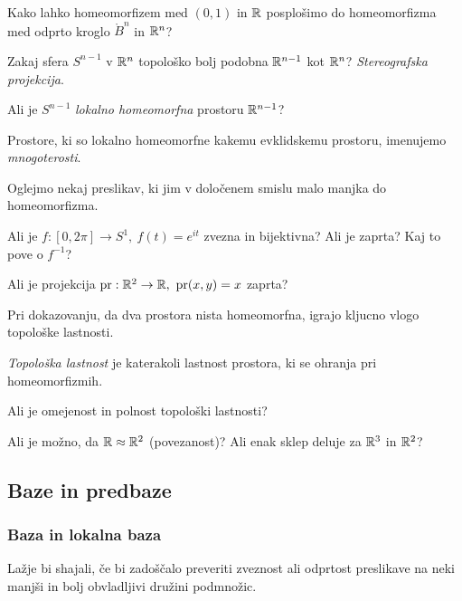 \begin{primer}
    Kako lahko homeomorfizem med $(0, 1)$ in $\mathbb{R}$ posplošimo do homeomorfizma med odprto kroglo $\mathring{B}^n$ in $\mathbb{R}^n$?
\end{primer}

\begin{primer}
    Zakaj sfera $S^{n-1}$ v $\mathbb{R}^n$ topološko bolj podobna $\mathbb{R}^{n-1}$ kot $\mathbb{R}^n$? \emph{Stereografska projekcija}.

    Ali je $S^{n-1}$ \emph{lokalno homeomorfna} prostoru $\mathbb{R}^{n-1}$?
\end{primer}

\begin{definicija}
    Prostore, ki so lokalno homeomorfne kakemu evklidskemu prostoru, imenujemo \emph{mnogoterosti}.
\end{definicija}

Oglejmo nekaj preslikav, ki jim v določenem smislu malo manjka do homeomorfizma.

\begin{primer}
    Ali je $f: [0, 2 \pi] \to S^1, \ f(t) = e^{it}$ zvezna in bijektivna? Ali je zaprta? Kaj to pove o $f^{-1}$?
\end{primer}

\begin{primer}
    Ali je projekcija $\pr: \R^2 \to \R, \ \pr(x,y) = x$ zaprta?
\end{primer}

Pri dokazovanju, da dva prostora nista homeomorfna, igrajo kljucno vlogo topološke lastnosti.

\begin{definicija}
    \emph{Topološka lastnost} je katerakoli lastnost prostora, ki se ohranja pri homeomorfizmih.
\end{definicija}

\begin{primer}
    Ali je omejenost in polnost topološki lastnosti?
\end{primer}

\begin{primer}
    Ali je možno, da $\mathbb{R} \approx \mathbb{R}^2$ (povezanost)? Ali enak sklep deluje za $\mathbb{R}^3$ in $\mathbb{R}^2$?
\end{primer}

\newpage
\subsection{Baze in predbaze}
\subsubsection{Baza in lokalna baza}
Lažje bi shajali, če bi zadoščalo preveriti zveznost ali odprtost preslikave na neki manjši in bolj obvladljivi družini podmnožic.

